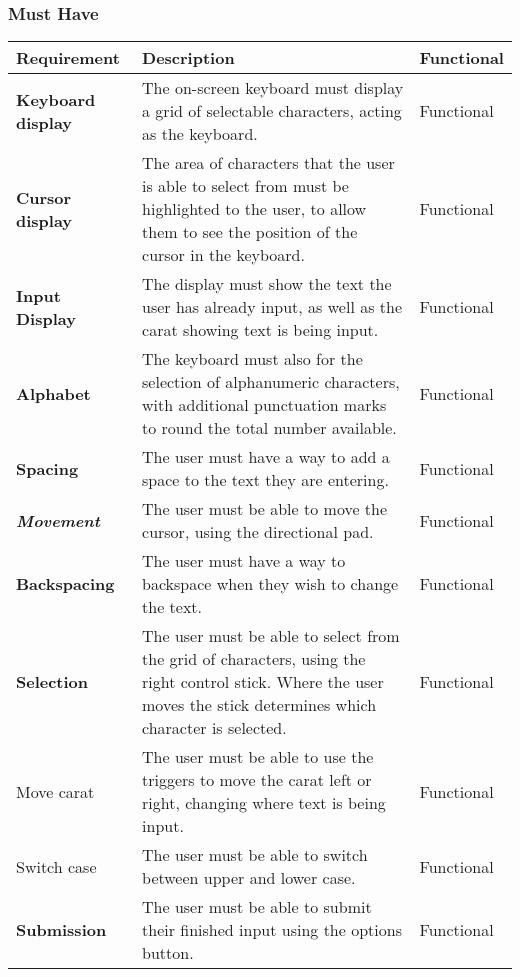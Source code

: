 \documentclass[requirements.tex]{subfiles}
\begin{document}
\subsubsection{Must Have} %
\label{ssub:after_must_have}
\begin{table}[H]
\scriptsize
\begin{tabularx}{\textwidth}{| l | X | l |}
 \hline
 \textbf{Requirement} & \textbf{Description} & \textbf{Functional} \\
 \hline
 \textbf{Keyboard display} & The on-screen keyboard must display a grid of
 selectable characters, acting as the keyboard. & Functional \\
 \hline
 \textbf{Cursor display} & The area of characters that the user is able to
 select from must be highlighted to the user, to allow them to see the position
 of the cursor in the keyboard. & Functional \\
 \hline
 \textbf{Input Display} & The display must show the text the user has already
 input, as well as the carat showing text is being input. & Functional \\
 \hline
 \textbf{Alphabet} & The keyboard must also for the selection of alphanumeric
 characters, with additional punctuation marks to round the total number
 available. & Functional \\
 \hline
 \textbf{Spacing} & The user must have a way to add a space to the text they are
 entering. & Functional \\
 \hline
 \textbf{\emph{Movement}} & The user must be able to move the cursor, using the
 directional pad. & Functional \\
 \hline
 \textbf{Backspacing} & The user must have a way to backspace when they wish to
 change the text. & Functional \\
 \hline
 \textbf{Selection} & The user must be able to select from the grid of
 characters, using the right control stick. Where the user moves the stick
 determines which character is selected. & Functional \\
 \hline
 Move carat & The user must be able to use the triggers to move the carat left
 or right, changing where text is being input. & Functional \\
 \hline
 Switch case & The user must be able to switch between upper and lower case.
 & Functional \\
 \hline
 \textbf{Submission} & The user must be able to submit their finished input
 using the options button. & Functional \\
 \hline
\end{tabularx}
\end{table}
\end{document}
